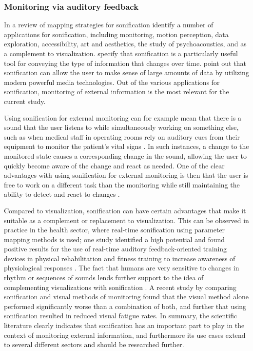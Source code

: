 \documentclass[10pt,a4paper,onecolumn]{article}
\begin{document}
\hypertarget{monitoring-via-auditory-feedback}{%
\subsubsection{Monitoring via auditory feedback}\label{monitoring-via-auditory-feedback}}

In a review of mapping strategies for sonification \textcite{dubusSystematicReviewMapping2013} identify a number of applications for sonification, including monitoring, motion perception, data exploration, accessibility, art and aesthetics, the study of psychoacoustics, and as a complement to visualization. \textcite{debashiSonificationNetworkTraffic2018} specify that sonification is a particularly useful tool for conveying the type of information that changes over time. \textcite{kramerSonificationReportStatus1999} point out that sonification can allow the user to make sense of large amounts of data by utilizing modern powerful media technologies. Out of the various applications for sonification, monitoring of external information is the most relevant for the current study.

Using sonification for external monitoring can for example mean that there is a sound that the user listens to while simultaneously working on something else, such as when medical staff in operating rooms rely on auditory cues from their equipment to monitor the patient's vital signs \autocite{dubusInteractiveSonificationMotion2013}. In such instances, a change to the monitored state causes a corresponding change in the sound, allowing the user to quickly become aware of the change and react as needed. One of the clear advantages with using sonification for external monitoring is then that the user is free to work on a different task than the monitoring while still maintaining the ability to detect and react to changes \autocite{vickersSonificationProcessMonitoring2011}.

Compared to visualization, sonification can have certain advantages that make it suitable as a complement or replacement to visualization. This can be observed in practice in the health sector, where real-time sonification using parameter mapping methods is used; one study identified a high potential and found positive results for the use of real-time auditory feedback-oriented training devices in physical rehabilitation and fitness training to increase awareness of physiological responses \autocite{yangRealtimeSonificationBiceps2015}. The fact that humans are very sensitive to changes in rhythm or sequences of sounds lends further support to the idea of complementing visualizations with sonification \autocite{hildebrandtShortPaperEnhancing2014}. A recent study by \textcite{debashiSonificationNetworkTraffic2018} comparing sonification and visual methods of monitoring found that the visual method alone performed significantly worse than a combination of both, and further that using sonification resulted in reduced visual fatigue rates. In summary, the scientific literature clearly indicates that sonification has an important part to play in the context of monitoring external information, and furthermore its use cases extend to several different sectors and should be researched further.
\end{document}
